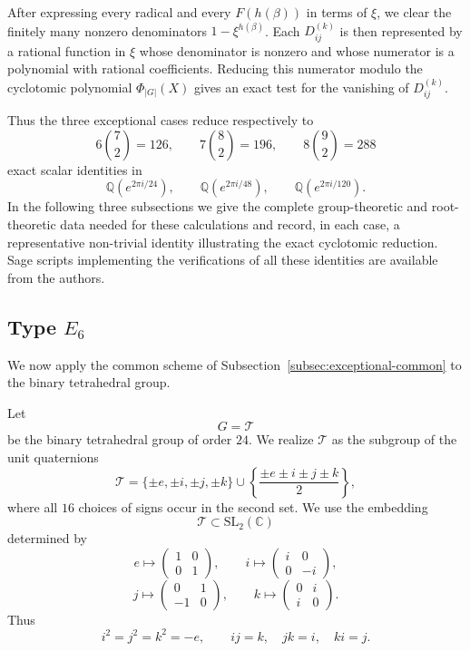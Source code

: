 \documentclass[a4paper,reqno]{amsart}
\theoremstyle{plain} %
\theoremstyle{definition} %
\theoremstyle{remark} %
\newcommand{\1}{\mathds{1}}   %
\begin{document}
After expressing every radical and every \(F(h(\beta))\) in terms of
\(\xi\), we clear the finitely many nonzero denominators
\(1-\xi^{h(\beta)}\).  Each \(D_{ij}^{(k)}\) is then represented by a
rational function in \(\xi\) whose denominator is nonzero and whose
numerator is a polynomial with rational coefficients.  Reducing this
numerator modulo the cyclotomic polynomial
\(\Phi_{|G|}(X)\) gives an exact test for the vanishing of
\(D_{ij}^{(k)}\).

Thus the three exceptional cases reduce respectively to
\[
6\binom{7}{2}=126,
\qquad
7\binom{8}{2}=196,
\qquad
8\binom{9}{2}=288
\]
exact scalar identities in
\[
\mathbb Q(e^{2\pi i/24}),
\qquad
\mathbb Q(e^{2\pi i/48}),
\qquad
\mathbb Q(e^{2\pi i/120}).
\]
In the following three subsections we give the complete group-theoretic
and root-theoretic data needed for these calculations and record, in
each case, a representative non-trivial identity illustrating the exact
cyclotomic reduction. Sage scripts implementing the verifications of all these identities are available from the authors.

\subsection{Type \(E_6\)}
\label{subsec:E6}

We now apply the common scheme of Subsection~\ref{subsec:exceptional-common}
to the binary tetrahedral group.

Let
\[
G=\mathcal T
\]
be the binary tetrahedral group of order \(24\).  We realize
\(\mathcal T\) as the subgroup of the unit quaternions
\[
\mathcal T
=
\{\pm e,\pm i,\pm j,\pm k\}
\cup
\left\{
\frac{\pm e\pm i\pm j\pm k}{2}
\right\},
\]
where all \(16\) choices of signs occur in the second set.  We use the
embedding
\[
\mathcal T\subset \mathrm{SL}_2(\mathbb C)
\]
determined by
\[
e\longmapsto
\begin{pmatrix}
1&0\\
0&1
\end{pmatrix},
\qquad
i\longmapsto
\begin{pmatrix}
i&0\\
0&-i
\end{pmatrix},
\]
\[
j\longmapsto
\begin{pmatrix}
0&1\\
-1&0
\end{pmatrix},
\qquad
k\longmapsto
\begin{pmatrix}
0&i\\
i&0
\end{pmatrix}.
\]
Thus
\[
i^2=j^2=k^2=-e,
\qquad
ij=k,\quad jk=i,\quad ki=j.
\]
\end{document}
